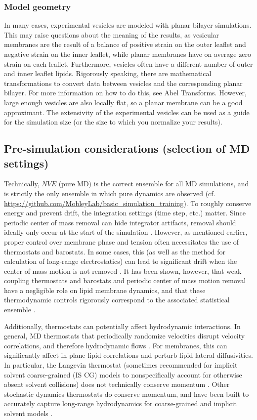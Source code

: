 \documentclass[9pt,bestpractices]{livecoms}
\begin{document}
\subsubsection{Model geometry}
\label{subsubsec:geometry}
In many cases, experimental vesicles are modeled with planar bilayer simulations.
This may raise questions about the meaning of the results, as vesicular membranes are the result of a balance of positive strain on the outer leaflet and negative strain on the inner leaflet, while planar membranes have on average zero strain on each leaflet.
Furthermore, vesicles often have a different number of outer and inner leaflet lipids.
Rigorously speaking, there are mathematical transformations to convert data between vesicles and the corresponding planar bilayer.
For more information on how to do this, see Abel Transforms.
However, large enough vesicles are also locally flat, so a planar membrane can be a good approximant.
The extensivity of the experimental vesicles can be used as a guide for the simulation size (or the size to which you normalize your results).

\subsection{Pre-simulation considerations (selection of MD settings)}
\label{subsec:presim4}

Technically, $NVE$ (pure MD) is the correct ensemble for all MD simulations, and is strictly the only ensemble in which pure dynamics are observed (cf. \url{https://github.com/MobleyLab/basic_simulation_training}).
To roughly conserve energy and prevent drift, the integration settings (time step, etc.) matter.
Since periodic center of mass removal can hide integrator artifacts, removal should ideally only occur at the start of the simulation \cite{Zgorski2016}.
However, as mentioned earlier, proper control over membrane phase and tension often necessitates the use of thermostats and barostats.
In some cases, this (as well as the method for calculation of long-range electrostatics) can lead to significant drift when the center of mass motion is not removed \cite{Zgorski2016}.
It has been shown, however, that weak-coupling thermostats and barostats and periodic center of mass motion removal have a negligible role on lipid membrane dynamics, and that these thermodynamic controls rigorously correspond to the associated statistical ensemble \cite{Venable2017}.

Additionally, thermostats can potentially affect hydrodynamic interactions.
In general, MD thermostats that periodically randomize velocities disrupt velocity correlations, and therefore hydrodynamic flows \cite{Zgorski2016}.
For membranes, this can significantly affect in-plane lipid correlations and perturb lipid lateral diffusivities.
In particular, the Langevin thermostat (sometimes recommended for implicit solvent coarse-grained (IS CG) models to nonspecifically account for otherwise absent solvent collisions) does not technically conserve momentum \cite{Goga2012}.
Other stochastic dynamics thermostats do conserve momentum, and have been built to accurately capture long-range hydrodynamics for coarse-grained and implicit solvent models \cite{Zgorski2016,Wang2013}.
\end{document}
